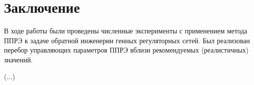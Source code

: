\chapter*{Заключение}						%

В ходе работы были проведены численные эксперименты с применением метода ППРЭ 
к задаче обратной инженерии генных регуляторных сетей. Был реализован перебор 
управляющих параметров ППРЭ вблизи рекомендуемых (реалистичных) значений.

(...)

\clearpage
